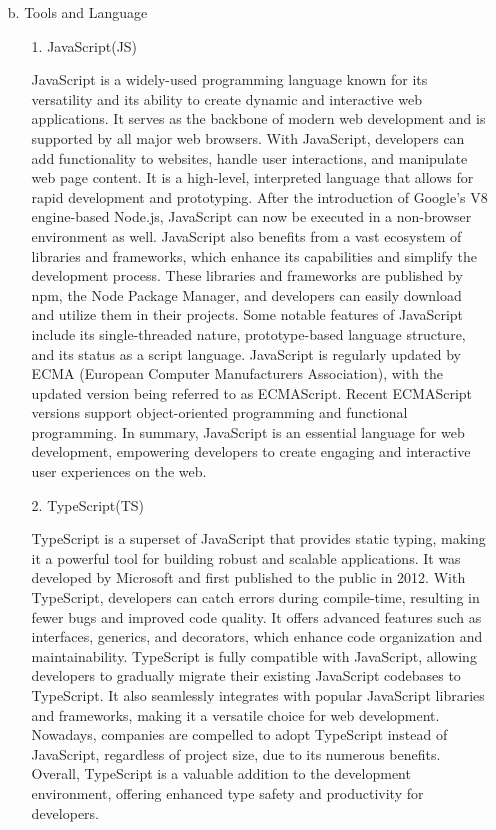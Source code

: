 \documentclass[conference, a4paper]{IEEEtran}
\begin{document}
\begin{enumerate}
    \item[b.]Tools and Language

    \begin{enumerate}
        \item[1.]JavaScript(JS)
        \item[]JavaScript is a widely-used programming language known for its versatility and its ability to create dynamic and interactive web applications. It serves as the backbone of modern web development and is supported by all major web browsers. With JavaScript, developers can add functionality to websites, handle user interactions, and manipulate web page content. It is a high-level, interpreted language that allows for rapid development and prototyping. After the introduction of Google's V8 engine-based Node.js, JavaScript can now be executed in a non-browser environment as well. JavaScript also benefits from a vast ecosystem of libraries and frameworks, which enhance its capabilities and simplify the development process. These libraries and frameworks are published by npm, the Node Package Manager, and developers can easily download and utilize them in their projects. Some notable features of JavaScript include its single-threaded nature, prototype-based language structure, and its status as a script language. JavaScript is regularly updated by ECMA (European Computer Manufacturers Association), with the updated version being referred to as ECMAScript. Recent ECMAScript versions support object-oriented programming and functional programming. In summary, JavaScript is an essential language for web development, empowering developers to create engaging and interactive user experiences on the web. \\

        \item[2.]TypeScript(TS) \cite{typescript}
        \item[]TypeScript is a superset of JavaScript that provides static typing, making it a powerful tool for building robust and scalable applications. It was developed by Microsoft and first published to the public in 2012. With TypeScript, developers can catch errors during compile-time, resulting in fewer bugs and improved code quality. It offers advanced features such as interfaces, generics, and decorators, which enhance code organization and maintainability. TypeScript is fully compatible with JavaScript, allowing developers to gradually migrate their existing JavaScript codebases to TypeScript. It also seamlessly integrates with popular JavaScript libraries and frameworks, making it a versatile choice for web development. Nowadays, companies are compelled to adopt TypeScript instead of JavaScript, regardless of project size, due to its numerous benefits. Overall, TypeScript is a valuable addition to the development environment, offering enhanced type safety and productivity for developers.\\


\end{enumerate}
\end{enumerate}
\end{document}

